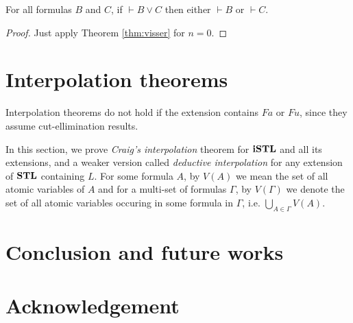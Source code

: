 \documentclass[12pt,a4paper]{article}
\begin{document}


\begin{cor}
	For all formulas $B$ and $C$, if $\vdash B \vee C$ then either $\vdash B$ or $\vdash C$.
\end{cor}
\begin{proof}
	Just apply Theorem \ref{thm:visser} for $n = 0$.
\end{proof}

\section{Interpolation theorems}
{\color{red} Interpolation theorems do not hold if the extension contains $Fa$ or $Fu$, since they assume cut-ellimination results.}

In this section, we prove \emph{Craig's interpolation} theorem for $\mathbf{iSTL}$ and all its extensions, and a weaker version called \emph{deductive interpolation} for any extension of $\mathbf{STL}$ containing $L$. For some formula $A$, by $V(A)$ we mean the set of all atomic variables of $A$ and for a multi-set of formulas $\Gamma$, by $V(\Gamma)$ we denote the set of all atomic variables occuring in some formula in $\Gamma$, i.e. $\bigcup_{A \in \Gamma} V(A)$.





\section{Conclusion and future works}

\section{Acknowledgement}



\end{document}
